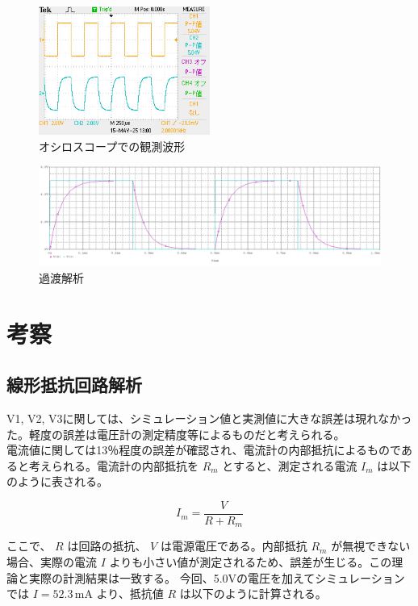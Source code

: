 \documentclass{jlreq}
\numberwithin{equation}{section}
\begin{document}
\begin{figure}[H]
  \centering
  \includegraphics[width=0.5\textwidth]{assets/katooshiro.JPG}
  \caption{オシロスコープでの観測波形}
\end{figure}

\begin{figure}[H]
  \centering
  \includegraphics[width=\textwidth]{assets/katokaisekiplot.png}
  \caption{過渡解析}
\end{figure}

\section{考察}
\subsection{線形抵抗回路解析}
V1, V2, V3に関しては、シミュレーション値と実測値に大きな誤差は現れなかった。軽度の誤差は電圧計の測定精度等によるものだと考えられる。\\
電流値に関しては13％程度の誤差が確認され、電流計の内部抵抗によるものであると考えられる。電流計の内部抵抗を \( R_m \) とすると、測定される電流 \( I_m \) は以下のように表される。

\[
I_m = \frac{V}{R + R_m}
\]

ここで、 \( R \) は回路の抵抗、 \( V \) は電源電圧である。内部抵抗 \( R_m \) が無視できない場合、実際の電流 \( I \) よりも小さい値が測定されるため、誤差が生じる。この理論と実際の計測結果は一致する。
今回、5.0Vの電圧を加えてシミュレーションでは \( I = 52.3 \, \mathrm{mA} \) より、抵抗値 \( R \) は以下のように計算される。
\end{document}
